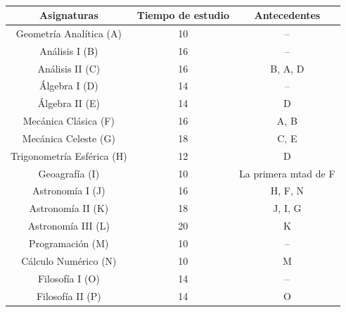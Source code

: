 \documentclass[autocontact]{gaceta}
\begin{document}
        \begin{table}[h]
            \begin{center}
            
                \begin{tabular}{|c|c|c|}
                    \hline
                    Asignaturas & Tiempo de estudio & Antecedentes \\
                    \hline
                    Geometría Analítica (A) & 10 & -- \\
                    \hline
                    Análisis I (B) & 16 & --\\
                    \hline
                    Análisis II (C) & 16 & B, A, D\\
                    \hline
                    Álgebra I (D) & 14 & -- \\
                    \hline
                    Álgebra II (E) & 14 & D \\
                    \hline
                    Mecánica Clásica (F) & 16 & A, B \\
                    \hline 
                    Mecánica Celeste (G) & 18 & C, E \\
                    \hline 
                    Trigonometría Esférica (H) & 12 & D \\
                    \hline
                    Geoagrafía (I) & 10 & La primera mtad de F  \\
                    \hline 
                    Astronomía I (J) & 16 & H, F, N \\ 
                    \hline 
                    Astronomía II (K) & 18 & J, I, G \\   
                    \hline 
                    Astronomía III (L) & 20 & K \\  
                    \hline 
                    Programación (M) & 10 & -- \\           
                    \hline
                    Cálculo Numérico (N) & 10 & M \\
                    \hline 
                    Filosofía I (O) & 14 & -- \\
                    \hline 
                    Filosofía II (P) & 14 & O \\
                    \hline                     
                
                \end{tabular}   
            
            \end{center}
            \caption{}
        \end{table}
\end{document}
